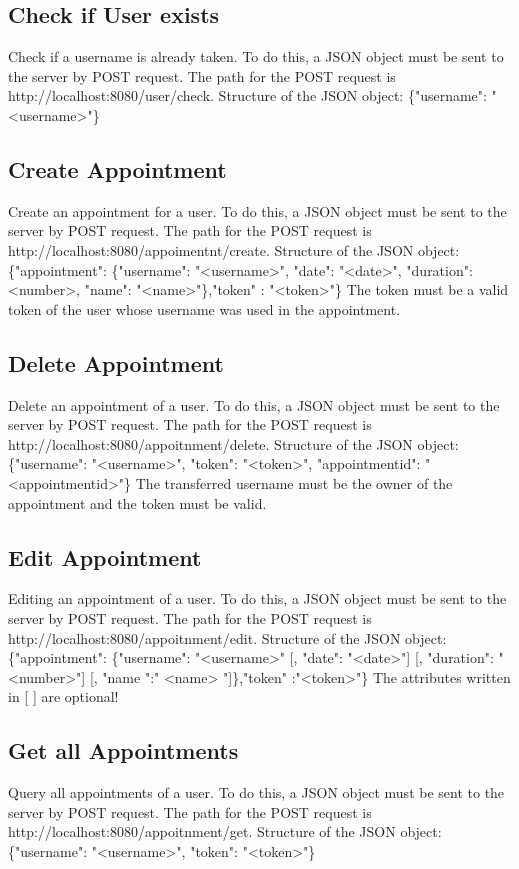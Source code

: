 \documentclass[12pt]{scrartcl}
\begin{document}
    \subsection{Check if User exists}
        Check if a username is already taken.
        To do this, a JSON object must be sent to the server by POST request. The path for the POST request is
        {http://localhost:8080/user/check}.
        Structure of the JSON object: \{"username": "<username>"\}

    \subsection{Create Appointment}
        Create an appointment for a user.
        To do this, a JSON object must be sent to the server by POST request. The path for the POST request is
        {http://localhost:8080/appoimentnt/create}.
        Structure of the JSON object: \{"appointment": \{"username": "<username>", "date": "<date>", "duration": <number>, "name": "<name>"\},"token" : "<token>"\}
        The token must be a valid token of the user whose username was used in the appointment.

    \subsection{Delete Appointment}
        Delete an appointment of a user.
        To do this, a JSON object must be sent to the server by POST request. The path for the POST request is
        {http://localhost:8080/appoitnment/delete}.
        Structure of the JSON object: \{"username": "<username>", "token": "<token>", "appointmentid": "<appointmentid>"\}
        The transferred username must be the owner of the appointment and the token must be valid.

    \subsection{Edit Appointment}
        Editing an appointment of a user.
        To do this, a JSON object must be sent to the server by POST request. The path for the POST request is {http://localhost:8080/appoitnment/edit}.
        Structure of the JSON object: \{"appointment": \{"username": "<username>" [, "date": "<date>"] [, "duration": "<number>"] [, "name ":" <name> "]\},"token" :"<token>"\}
        The attributes written in {[ ]} are optional!
    

    \subsection{Get all Appointments}
        Query all appointments of a user.
        To do this, a JSON object must be sent to the server by POST request. The path for the POST request is
        {http://localhost:8080/appoitnment/get}.
        Structure of the JSON object: \{"username": "<username>", "token": "<token>"\}
\end{document}
